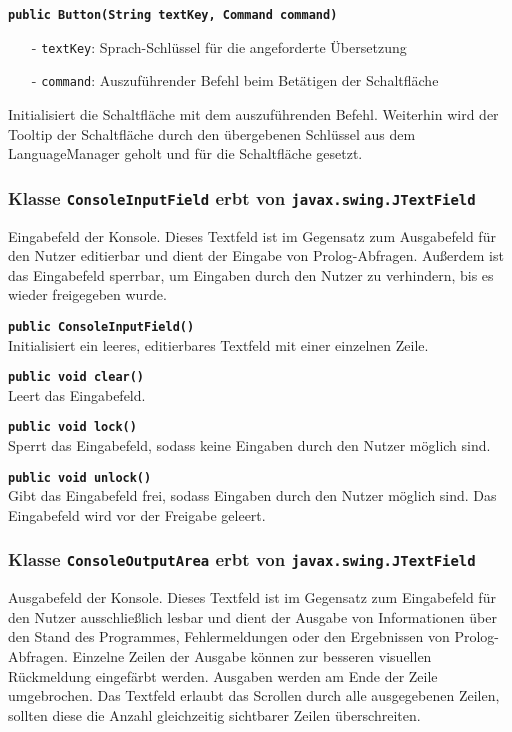\documentclass[parskip=full,11pt,twoside]{scrartcl}
\begin{document}
\textbf{\texttt{public Button(String textKey, Command command)}}
\begin{itemize}[noitemsep]
	\item[-] \texttt{textKey}: Sprach-Schlüssel für die angeforderte Übersetzung
	\item[-] \texttt{command}: Auszuführender Befehl beim Betätigen der Schaltfläche
\end{itemize}
Initialisiert die Schaltfläche mit dem auszuführenden Befehl. Weiterhin wird der Tooltip der Schaltfläche durch den übergebenen Schlüssel aus dem LanguageManager geholt und für die Schaltfläche gesetzt.

\subsubsection{Klasse \texttt{ConsoleInputField} erbt von \texttt{javax.swing.JTextField}}

Eingabefeld der Konsole. Dieses Textfeld ist im Gegensatz zum Ausgabefeld für den Nutzer editierbar und dient der Eingabe von Prolog-Abfragen. Außerdem ist das Eingabefeld sperrbar, um Eingaben durch den Nutzer zu verhindern, bis es wieder freigegeben wurde.

\textbf{\texttt{public ConsoleInputField()}}\\
Initialisiert ein leeres, editierbares Textfeld mit einer einzelnen Zeile.

\textbf{\texttt{public void clear()}}\\
Leert das Eingabefeld.

\textbf{\texttt{public void lock()}}\\
Sperrt das Eingabefeld, sodass keine Eingaben durch den Nutzer möglich sind.

\textbf{\texttt{public void unlock()}}\\
Gibt das Eingabefeld frei, sodass Eingaben durch den Nutzer möglich sind. Das Eingabefeld wird vor der Freigabe geleert.

\subsubsection{Klasse \texttt{ConsoleOutputArea} erbt von \texttt{javax.swing.JTextField}}

Ausgabefeld der Konsole. Dieses Textfeld ist im Gegensatz zum Eingabefeld für den Nutzer ausschließlich lesbar und dient der Ausgabe von Informationen über den Stand des Programmes, Fehlermeldungen oder den Ergebnissen von Prolog-Abfragen. Einzelne Zeilen der Ausgabe können zur besseren visuellen Rückmeldung eingefärbt werden. Ausgaben werden am Ende der Zeile umgebrochen. Das Textfeld erlaubt das Scrollen durch alle ausgegebenen Zeilen, sollten diese die Anzahl gleichzeitig sichtbarer Zeilen überschreiten.
\end{document}
